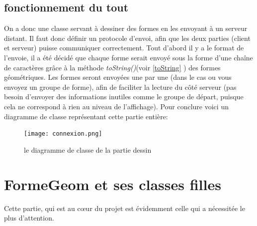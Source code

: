 \documentclass[10pt,a4paper]{report}
\begin{document}
\begin{spacing}{0.8}
\subsection{fonctionnement du tout}
On a donc une classe servant à dessiner des formes en les envoyant à un serveur distant. Il faut donc définir un protocole d'envoi, afin que les deux parties (client et serveur) puisse communiquer correctement.
Tout d'abord il y a le format de l'envoie, il a été décidé que chaque forme serait envoyé sous la forme d'une chaîne de caractères grâce à la méthode \textit{toString()}(voir \ref{toString} ) des formes géométriques.
Les formes seront envoyées une par une (dans le cas ou vous envoyez un groupe de forme), afin de faciliter la lecture du côté serveur (pas besoin d'envoyer des informations inutiles comme le groupe de départ, puisque cela ne correspond à rien au niveau de l'affichage).
Pour conclure voici un diagramme de classe représentant cette partie entière:
\begin{figure}
\texttt{[image: connexion.png]}
\caption{le diagramme de classe de la partie dessin}
\end{figure}


\section{FormeGeom et ses classes filles}
Cette partie, qui est au cœur du projet est évidemment celle qui a nécessitée le plus d'attention.

\end{spacing}
\end{document}
